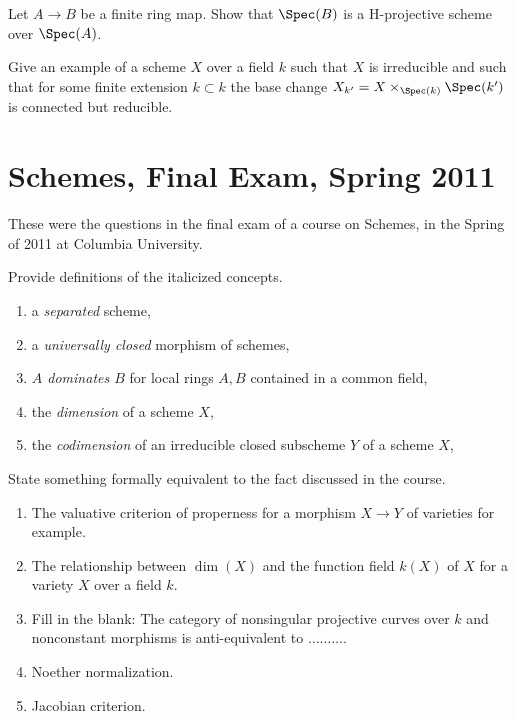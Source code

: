 \begin{exercise}
\label{exercise-finite-is-projective}
Let $A \to B$ be a finite ring map. Show that
$\Spec(B)$ is a H-projective scheme over $\Spec(A)$.
\end{exercise}

\begin{exercise}
\label{exercise-not-geometrically-irreducible}
Give an example of a scheme $X$ over a field $k$ such that
$X$ is irreducible and such that for some finite extension $k \subset k$
the base change $X_{k'} = X \times_{\Spec(k)} \Spec(k')$
is connected but reducible.
\end{exercise}





\section{Schemes, Final Exam, Spring 2011}
\label{section-final-exam-spring-2011}

\noindent
These were the questions in the final exam of a course on Schemes,
in the Spring of 2011 at Columbia University.

\begin{exercise}[Definitions]
\label{exercise-definitions-spring-2011}
Provide definitions of the italicized concepts.
\begin{enumerate}
\item a {\it separated} scheme,
\item a {\it universally closed} morphism of schemes,
\item {\it $A$ dominates $B$} for local rings $A, B$ contained in a
common field,
\item the {\it dimension} of a scheme $X$,
\item the {\it codimension} of an irreducible closed subscheme $Y$
of a scheme $X$,
\end{enumerate}
\end{exercise}

\begin{exercise}[Results]
\label{exercise-results-spring-2011}
State something formally equivalent to the fact discussed
in the course.
\begin{enumerate}
\item The valuative criterion of properness for a morphism
$X \to Y$ of varieties for example.
\item The relationship between $\dim(X)$ and the function field
$k(X)$ of $X$ for a variety $X$ over a field $k$.
\item Fill in the blank: The category of nonsingular projective curves over
$k$ and nonconstant morphisms is anti-equivalent to $\ldots\ldots\ldots$.
\item Noether normalization.
\item Jacobian criterion.
\end{enumerate}
\end{exercise}

